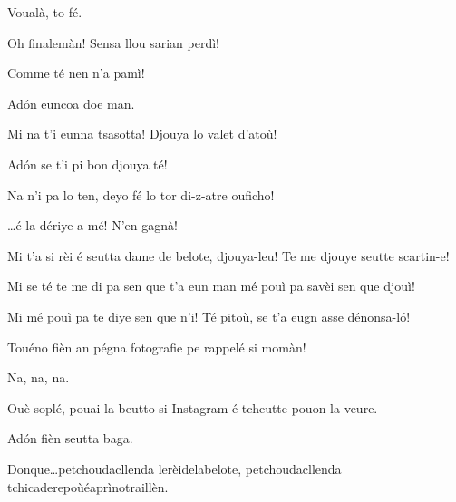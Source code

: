 \begin{drama}
\Elettricistaspeaks Voualà, to fé.

\Richardspeaks{} Oh finalemàn! Sensa llou sarian perdì!

\Tuenospeaks{} Comme té nen n'a pamì!


\Tuenospeaks Ad\'on euncoa doe man.


\Elettricistaspeaks {} Mi na t'i eunna tsasotta! Djouya lo valet d'atoù!

\Gerominespeaks Ad\'on se t'i pi bon djouya té!

\Elettricistaspeaks Na n'i pa lo ten, deyo fé lo tor di-z-atre ouficho!


\Saventaspeaks \ldots é la dériye a mé! N'en gagnà! 

\Richardspeaks{} Mi t'a si rèi é seutta dame de belote, djouya-leu! Te me djouye seutte scartin-e!

\Gerominespeaks Mi se té te me di pa sen que t'a eun man mé pouì pa savèi sen que djouì!

\Richardspeaks Mi mé pouì pa te diye sen que n'i! Té pitoù, se t'a eugn asse \asso dénonsa-l\'o!


\Saventaspeaks Touéno fièn an pégna fotografie pe rappelé si mo\-màn!

\Tuenospeaks Na, na, na.

\Saventaspeaks  Ouè soplé, pouai la beutto si Instagram é tcheutte pouon la veure.

\Tuenospeaks Ad\'on fièn seutta baga.


\Saventaspeaks Donque\ldots petchoudacllenda lerèidelabelote, petchoudacllen\-da tchicaderepoùéaprìnotraillèn.




\end{drama}
